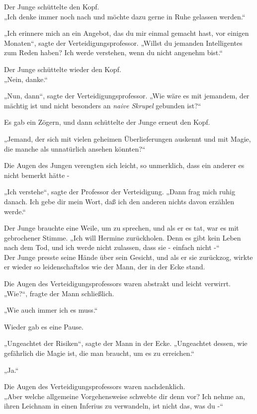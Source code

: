 {Der Junge schüttelte den Kopf.\\ „Ich denke immer noch nach und möchte dazu gerne in Ruhe gelassen werden.“

„Ich erinnere mich an ein Angebot, das du mir einmal gemacht hast, vor einigen Monaten“, sagte der Verteidigungsprofessor. „Willst du jemanden Intelligentes zum Reden haben? Ich werde verstehen, wenn du nicht angenehm bist.“

Der Junge schüttelte wieder den Kopf.\\ „Nein, danke.“

„Nun, dann“, sagte der Verteidigungsprofessor. „Wie wäre es mit jemandem, der mächtig ist und nicht besonders an \emph{naive Skrupel} gebunden ist?“

Es gab ein Zögern, und dann schüttelte der Junge erneut den Kopf.

„Jemand, der sich mit vielen geheimen Überlieferungen auskennt und mit Magie, die manche als unnatürlich ansehen könnten?“

Die Augen des Jungen verengten sich leicht, so unmerklich, dass ein anderer es nicht bemerkt hätte -

„Ich verstehe“, sagte der Professor der Verteidigung. „Dann frag mich ruhig danach. Ich gebe dir mein Wort, daß ich den anderen nichts davon erzählen werde.“

Der Junge brauchte eine Weile, um zu sprechen, und als er es tat, war es mit gebrochener Stimme. „Ich will Hermine zurückholen. Denn es gibt kein Leben nach dem Tod, und ich werde nicht zulassen, dass sie - einfach nicht -“\\ Der Junge presste seine Hände über sein Gesicht, und als er sie zurückzog, wirkte er wieder so leidenschaftslos wie der Mann, der in der Ecke stand.

Die Augen des Verteidigungsprofessors waren abstrakt und leicht verwirrt.\\ „Wie?“, fragte der Mann schließlich.

„Wie auch immer ich es muss.“

Wieder gab es eine Pause.

„Ungeachtet der Risiken“, sagte der Mann in der Ecke. „Ungeachtet dessen, wie gefährlich die Magie ist, die man braucht, um es zu erreichen.“

„Ja.“

Die Augen des Verteidigungsprofessors waren nachdenklich.\\ „Aber welche allgemeine Vorgehensweise schwebte dir denn vor? Ich nehme an, ihren Leichnam in einen Inferius zu verwandeln, ist nicht das, was du -“

}
